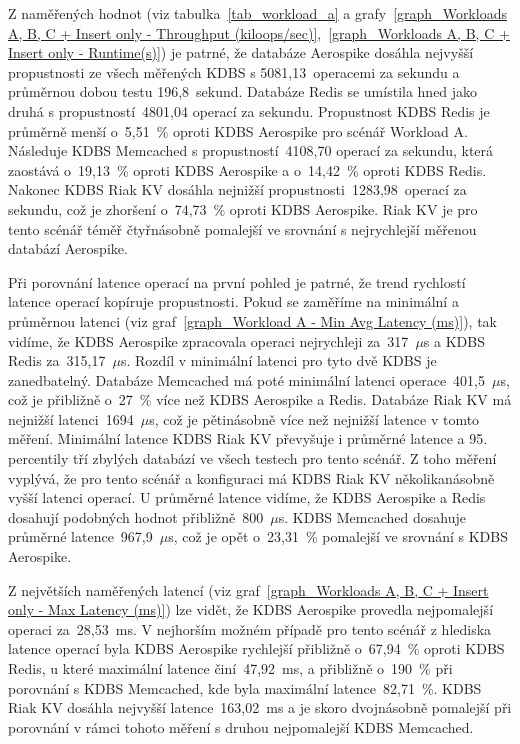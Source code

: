 \documentclass[czech,master,dept460,male,csharp,cpdeclaration]{diploma}
\begin{document}
	Z naměřených hodnot (viz tabulka~\ref{tab_workload_a} a grafy~\ref{graph_Workloads A, B, C + Insert only - Throughput (kiloops/sec)},~\ref{graph_Workloads A, B, C + Insert only - Runtime(s)}) je patrné, že databáze Aerospike dosáhla nejvyšší propustnosti ze všech měřených KDBS s 5081,13~operacemi za sekundu a průměrnou dobou testu 196,8~sekund. Databáze Redis se umístila hned jako druhá s propustností~4801,04 operací za sekundu. Propustnost KDBS Redis je průměrně menší o~5,51~\% oproti KDBS Aerospike pro scénář Workload A. Následuje KDBS Memcached s propustností~4108,70 operací za sekundu, která zaostává o~19,13~\% oproti KDBS Aerospike a o~14,42~\% oproti KDBS Redis. Nakonec KDBS Riak KV dosáhla nejnižší propustnosti~1283,98~operací za sekundu, což je zhoršení o~74,73~\% oproti KDBS Aerospike. Riak KV je pro tento scénář téměř čtyřnásobně pomalejší ve srovnání s nejrychlejší měřenou databází Aerospike.
	
	Při porovnání latence operací na první pohled je patrné, že trend rychlostí latence operací kopíruje propustnosti. Pokud se zaměříme na minimální a průměrnou latenci (viz graf~\ref{graph_Workload A - Min Avg Latency (ms)}), tak vidíme, že KDBS Aerospike zpracovala operaci nejrychleji za~317~$\mu$s a KDBS Redis za~315,17~$\mu$s. Rozdíl v minimální latenci pro tyto dvě KDBS je zanedbatelný. Databáze Memcached má poté minimální latenci operace~401,5~$\mu$s, což je přibližně o~27~\% více než KDBS Aerospike a Redis. Databáze Riak KV má nejnižší latenci~1694~$\mu$s, což je pětinásobně více než nejnižší latence v tomto měření. Minimální latence KDBS Riak KV převyšuje i průměrné latence a 95. percentily tří zbylých databází ve všech testech pro tento scénář. Z toho měření vyplývá, že pro tento scénář a konfiguraci má KDBS Riak KV několikanásobně vyšší latenci operací. U průměrné latence vidíme, že KDBS Aerospike a Redis dosahují podobných hodnot přibližně~800~$\mu$s. KDBS Memcached dosahuje průměrné latence~967,9~$\mu$s, což je opět o~23,31~\% pomalejší ve srovnání s KDBS Aerospike.
	
	Z největších naměřených latencí (viz graf~\ref{graph_Workloads A, B, C + Insert only - Max Latency (ms)}) lze vidět, že KDBS Aerospike provedla nejpomalejší operaci za~28,53~ms. V nejhorším možném případě pro tento scénář z hlediska latence operací byla KDBS Aerospike rychlejší přibližně o~67,94~\% oproti KDBS Redis, u které maximální latence činí~47,92~ms, a přibližně o~190~\% při porovnání s KDBS Memcached, kde byla maximální latence~82,71~\%. KDBS Riak KV dosáhla nejvyšší latence~163,02~ms a je skoro dvojnásobně pomalejší při porovnání v rámci tohoto měření s druhou nejpomalejší KDBS Memcached.
	
\end{document}
